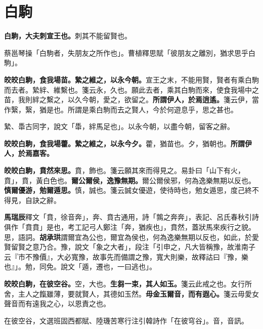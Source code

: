\section{白駒}


\textbf{白駒，大夫刺宣王也。}{\footnotesize 刺其不能留賢也。}

\begin{quoting}蔡邕琴操「白駒者，失朋友之所作也」。曹植釋思賦「彼朋友之離別，猶求思乎白駒」。\end{quoting}

\textbf{皎皎白駒，食我場苗。縶之維之，以永今朝。}{\footnotesize 宣王之末，不能用賢，賢者有乘白駒而去者。縶絆、維繫也。箋云永，久也。願此去者，乘其白駒而來，使食我場中之苗，我則絆之繫之，以久今朝，愛之，欲留之。}\textbf{所謂伊人，於焉逍遙。}{\footnotesize 箋云伊，當作繄，繄，猶是也。所謂是乘白駒而去之賢人，今於何遊息乎，思之甚也。}

\begin{quoting}縶、馽古同字，說文「馽，絆馬足也」。以永今朝，以盡今朝，留客之辭。\end{quoting}

\textbf{皎皎白駒，食我場藿。縶之維之，以永今夕。}{\footnotesize 藿，猶苗也。夕，猶朝也。}\textbf{所謂伊人，於焉嘉客。}

\textbf{皎皎白駒，賁然來思。}{\footnotesize 賁，飾也。箋云願其來而得見之。易卦曰「山下有火，賁」，賁，黃白色也。}\textbf{爾公爾侯，逸豫無期。}{\footnotesize 爾公爾侯邪，何為逸樂無期以反也。}\textbf{慎爾優游，勉爾遁思。}{\footnotesize 慎，誠也。箋云誠女優遊，使待時也，勉女遁思，度己終不得見，自訣之辭。}

\begin{quoting}\textbf{馬瑞辰}釋文「賁，徐音奔」，奔、賁古通用，詩「鶉之奔奔」，表記、呂氏春秋引詩俱作「賁賁」是也，考工記弓人鄭注「奔，猶疾也」，賁然，蓋狀馬來疾行之貌。思，語詞。\textbf{胡承珙}謂爾宜為公也，爾宜為侯也，何為逸樂無期以反也，如此，於愛賢留賢之意乃合。豫，說文「象之大者」，段注「引申之，凡大皆稱豫，故淮南子云『市不豫價』，大必寬豫，故事先而備謂之豫，寬大則樂，故釋詁曰『豫，樂也』」。勉，同免。說文「遁，遷也，一曰逃也」。\end{quoting}

\textbf{皎皎白駒，在彼空谷。}{\footnotesize 空，大也。}\textbf{生芻一束，其人如玉。}{\footnotesize 箋云此戒之也。女行所舍，主人之餼雖薄，要就賢人，其德如玉然。}\textbf{毋金玉爾音，而有遐心。}{\footnotesize 箋云毋愛女聲音而有遠我之心，以恩責之也。}

\begin{quoting}在彼空谷，文選班固西都賦、陸璣苦寒行注引韓詩作「在彼穹谷」。音，音訊。\end{quoting}

